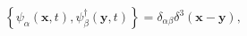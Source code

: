 \begin{equation}
\left\{ \psi _{\alpha }(\mathbf{x},t),\psi _{\beta }^{\dagger }(\mathbf{y}%
,t)\right\} =\delta _{\alpha \beta }\delta ^{3}\left( \mathbf{x}-\mathbf{y}%
\right) ,
\end{equation}

